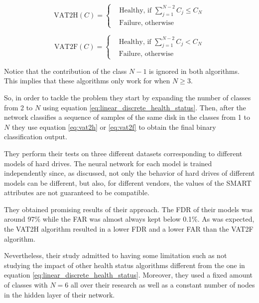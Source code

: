 
\begin{equation}\label{eq:vat2h}
    \text{VAT2H}(C) = 
    \begin{cases}
        & \text{Healthy, if } \sum_{j=1}^{N-2}C_j \leq C_N \\
        & \text{Failure, otherwise}
    \end{cases}
\end{equation}

\begin{equation}\label{eq:vat2f}
    \text{VAT2F}(C) = 
    \begin{cases}
        & \text{Healthy, if } \sum_{j=1}^{N-2}C_j < C_N \\
        & \text{Failure, otherwise}
    \end{cases}
\end{equation}

Notice that the contribution of the class $N-1$ is ignored in both algorithms.
This implies that these algorithms only work for when $N \geq 3$.

So, in order to tackle the problem they start by expanding the number of classes from 2 to $N$ using equation \ref{eq:linear_discrete_health_status}.
Then, after the network classifies a sequence of samples of the same disk in the classes from 1 to $N$ they use equation \ref{eq:vat2h} or \ref{eq:vat2f} to obtain the final binary classification output.

They perform their tests on three different datasets corresponding to different models of hard drives.
The neural network for each model is trained independently since, as discussed, not only the behavior of hard drives of different models can be different, but also, for different vendors, the values of the SMART attributes are not guaranteed to be compatible.

They obtained promising results of their approach.
The FDR of their models was around 97\% while the FAR was almost always kept below 0.1\%.
As was expected, the VAT2H algorithm resulted in a lower FDR and a lower FAR than the VAT2F algorithm.

Nevertheless, their study admitted to having some limitation such as not studying the impact of other health status algorithms different from the one in equation \ref{eq:linear_discrete_health_status}.
Moreover, they used a fixed amount of classes with $N=6$ all over their research as well as a constant number of nodes in the hidden layer of their network.

